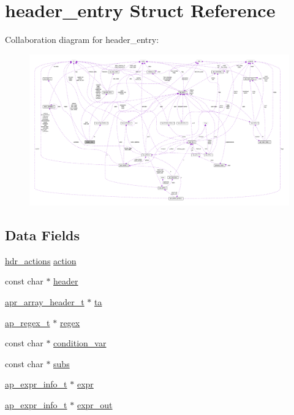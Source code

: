\hypertarget{structheader__entry}{}\section{header\+\_\+entry Struct Reference}
\label{structheader__entry}


Collaboration diagram for header\+\_\+entry\+:
\nopagebreak
\begin{figure}[H]
\begin{center}
\leavevmode
\includegraphics[width=350pt]{structheader__entry__coll__graph}
\end{center}
\end{figure}
\subsection*{Data Fields}
\begin{DoxyCompactItemize}
\item 
\hyperlink{mod__headers_8c_a4e939d94f5cdefee38ff352473d7b72f}{hdr\+\_\+actions} \hyperlink{structheader__entry_a3f6536b4df4b6f0e404a8c4822c2db6d}{action}
\item 
const char $\ast$ \hyperlink{structheader__entry_a4e6ec5b76041d380cfb359e4d1f981e0}{header}
\item 
\hyperlink{structapr__array__header__t}{apr\+\_\+array\+\_\+header\+\_\+t} $\ast$ \hyperlink{structheader__entry_afe7f682b2b3f775c7db623ae1bc93e02}{ta}
\item 
\hyperlink{structap__regex__t}{ap\+\_\+regex\+\_\+t} $\ast$ \hyperlink{structheader__entry_a872ecb8432a0e9b9b76a0cd1ee86ba32}{regex}
\item 
const char $\ast$ \hyperlink{structheader__entry_abeca9081eca8ea83ecaae5d6041b591d}{condition\+\_\+var}
\item 
const char $\ast$ \hyperlink{structheader__entry_ad4c8f3594ee1b780330649358ae4d2a4}{subs}
\item 
\hyperlink{structap__expr__info__t}{ap\+\_\+expr\+\_\+info\+\_\+t} $\ast$ \hyperlink{structheader__entry_a5b70f613dfff9a924033e8ab8956e2b8}{expr}
\item 
\hyperlink{structap__expr__info__t}{ap\+\_\+expr\+\_\+info\+\_\+t} $\ast$ \hyperlink{structheader__entry_a952076119d4db1810e4e2c83ca0142a4}{expr\+\_\+out}
\end{DoxyCompactItemize}


